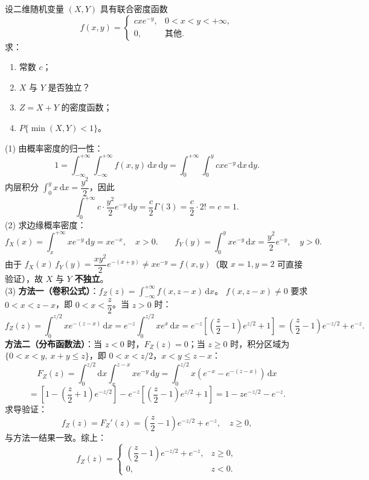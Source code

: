 ﻿\documentclass[lang=cn,11pt]{elegantbook}
\begin{document}
\begin{exercise} \label{exer:3-12e}
设二维随机变量 $(X,Y)$ 具有联合密度函数
\[
f(x,y) = \begin{cases} cxe^{-y}, & 0 < x < y < +\infty, \\ 0, & \text{其他}. \end{cases}
\]
求：
\begin{enumerate}
    \item[(1)] 常数 $c$；
    \item[(2)] $X$ 与 $Y$ 是否独立？
    \item[(3)] $Z = X + Y$ 的密度函数；
    \item[(4)] $P\{\min(X,Y) < 1\}$。
\end{enumerate}
\end{exercise}
\begin{solution}
(1) 由概率密度的归一性：
\[
1 = \int_{-\infty}^{+\infty}\int_{-\infty}^{+\infty}f(x,y)\,\mathrm{d}x\,\mathrm{d}y = \int_0^{+\infty}\int_0^y cxe^{-y}\,\mathrm{d}x\,\mathrm{d}y.
\]
内层积分 $\int_0^y x\,\mathrm{d}x = \dfrac{y^2}{2}$，因此
\[
\int_0^{+\infty}c \cdot \frac{y^2}{2}e^{-y}\,\mathrm{d}y = \frac{c}{2}\Gamma(3) = \frac{c}{2} \cdot 2! = c = 1.
\]
(2) 求边缘概率密度：
\[
f_X(x) = \int_x^{+\infty}xe^{-y}\,\mathrm{d}y = xe^{-x}, \quad x > 0. \qquad f_Y(y) = \int_0^y xe^{-y}\,\mathrm{d}x = \frac{y^2}{2}e^{-y}, \quad y > 0.
\]
由于 $f_X(x)\,f_Y(y) = \dfrac{xy^2}{2}e^{-(x+y)} \neq xe^{-y} = f(x,y)$（取 $x=1, y=2$ 可直接验证），故 $X$ 与 $Y$ \textbf{不独立}。\\
(3) \textbf{方法一（卷积公式）}：$f_Z(z) = \displaystyle\int_{-\infty}^{+\infty}f(x, z-x)\,\mathrm{d}x$。
$f(x, z-x) \neq 0$ 要求 $0 < x < z-x$，即 $0 < x < \dfrac{z}{2}$。当 $z > 0$ 时：
\[
f_Z(z) = \int_0^{z/2}xe^{-(z-x)}\,\mathrm{d}x = e^{-z}\int_0^{z/2}xe^x\,\mathrm{d}x = e^{-z}\left[\left(\frac{z}{2}-1\right)e^{z/2} + 1\right] = \left(\frac{z}{2}-1\right)e^{-z/2} + e^{-z}.
\]
\textbf{方法二（分布函数法）}：当 $z < 0$ 时，$F_Z(z) = 0$；当 $z \geqslant 0$ 时，积分区域为 $\{0 < x < y,\ x+y \leqslant z\}$，即 $0 < x < z/2$，$x < y \leqslant z-x$：
\[
F_Z(z) = \int_0^{z/2}\mathrm{d}x\int_x^{z-x}xe^{-y}\,\mathrm{d}y = \int_0^{z/2}x(e^{-x} - e^{-(z-x)})\,\mathrm{d}x
\]
\[
= \left[1 - \left(\frac{z}{2}+1\right)e^{-z/2}\right] - e^{-z}\left[\left(\frac{z}{2}-1\right)e^{z/2} + 1\right] = 1 - ze^{-z/2} - e^{-z}.
\]
求导验证：
\[
f_Z(z) = F_Z'(z) = \left(\frac{z}{2}-1\right)e^{-z/2} + e^{-z}, \quad z \geqslant 0,
\]
与方法一结果一致。综上：
\[
f_Z(z) = \begin{cases} \left(\dfrac{z}{2}-1\right)e^{-z/2} + e^{-z}, & z \geqslant 0, \\ 0, & z < 0. \end{cases}
\]
\end{solution}
\end{document}
